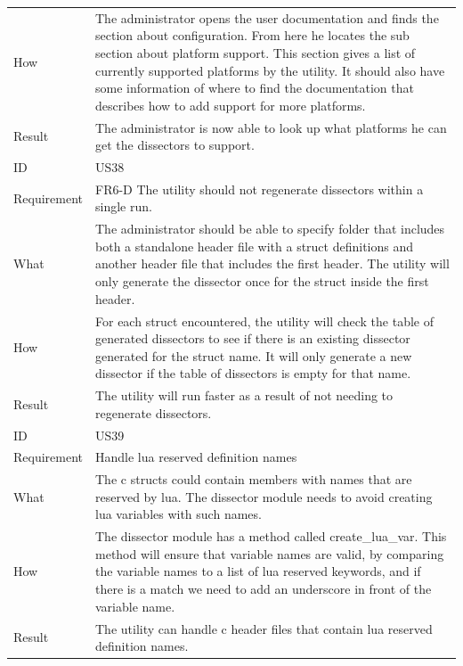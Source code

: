 \begin{table}[htbp]
{\begin{tabularx}{1.2\textwidth}{l X}
	How & The administrator opens the user documentation and finds the section about configuration. From here he locates the sub section about platform support.
	This section gives a list of currently supported platforms by the \gls{utility}. It should also have some information of where to	find the documentation that describes
	how to add support for more platforms. \\
	Result & The administrator is now able to look up what platforms he can get the \glspl{dissector} to support. \\
	\midrule
	ID & US38 \\
	Requirement & FR6-D The \gls{utility} should not regenerate \glspl{dissector} within a single run. \\
	What & The administrator should be able to specify folder that includes both a standalone \gls{header} file with a \gls{struct} definitions and another \gls{header} file that includes
	the first \gls{header}. The \gls{utility} will only generate the \gls{dissector} once for the \gls{struct} inside the first \gls{header}. \\
	How & For each \gls{struct} encountered, the \gls{utility} will check the table of generated \glspl{dissector} to see if there is an existing \gls{dissector} generated for the \gls{struct} name.
	It will only generate a new \gls{dissector} if the table of \glspl{dissector} is empty for that name. \\
	Result & The \gls{utility} will run faster as a result of not needing to regenerate \glspl{dissector}. \\
	\midrule
	ID & US39 \\
	Requirement & Handle \Gls{lua} reserved definition names \\
	What & The \Gls{c} \glspl{struct} could contain \glspl{member} with names that are reserved by \Gls{lua}. The \gls{dissector} module needs to avoid creating \Gls{lua} variables with such names.  \\
	How &	 The \gls{dissector} module has a method called create\_lua\_var. This method will ensure that variable names are valid, by comparing the variable names to a list
	of \Gls{lua} reserved keywords, and if there is a match we need to add an underscore in front of the variable name. \\ 
	Result & The \gls{utility} can handle \Gls{c} \gls{header} files that contain \Gls{lua} reserved definition names. \\
	\bottomrule
\end{tabularx}}
\end{table}

